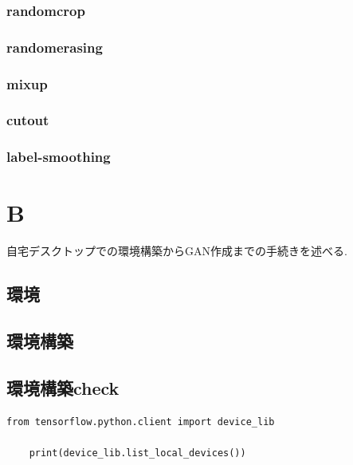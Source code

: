 \documentclass[a4paper,11pt]{jsarticle}
\begin{document}
\subsubsection{randomcrop}
\subsubsection{randomerasing}
\subsubsection{mixup}
\subsubsection{cutout}
\subsubsection{label-smoothing}

\section{B}
自宅デスクトップでの環境構築からGAN作成までの手続きを述べる.
\subsection{環境}

\subsection{環境構築}

\subsection{環境構築check}
\begin{lstlisting}[caption=check]
  from tensorflow.python.client import device_lib

    print(device_lib.list_local_devices()) 
  
\end{lstlisting}
\end{document}
